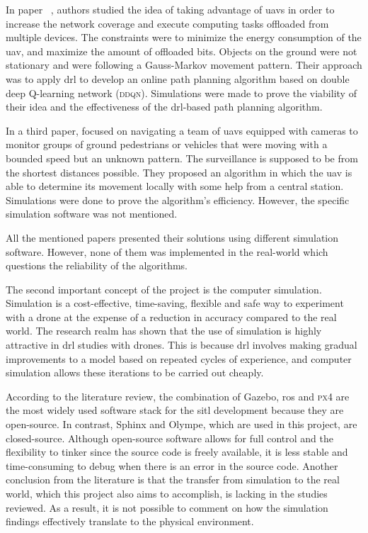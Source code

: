 \documentclass[../main.tex]{subfiles}
\begin{document}
		
		In paper ~\cite{pen21}, authors \citeauthor{pen21} studied the idea 
		of taking advantage of \glspl{uav} in order to increase the network
		 coverage and execute computing tasks offloaded from multiple devices. 
		The constraints were to minimize the energy consumption of the \gls{uav}, 
		and maximize the amount of offloaded bits. 
		Objects on the ground were not stationary and were following a Gauss-Markov 
		movement pattern. Their approach was to apply \gls{drl} to develop an online path planning algorithm based on double deep Q-learning network (\textsc{ddqn}).
		Simulations were made to prove the viability of their idea and the 
		effectiveness of the \gls{drl}-based path planning algorithm.
		
		In a third paper, \citeauthor{hua21} focused on navigating a team
		of \glspl{uav} equipped with cameras to monitor groups of ground 
		pedestrians or vehicles that were moving with a bounded speed but an unknown pattern. 
		The surveillance is supposed to be from the shortest distances possible. 
		They proposed an algorithm in which the \gls{uav} is able to determine 
		its movement locally with some help from a central station.
		Simulations were done to prove the algorithm's efficiency. However, the 
		specific simulation software was not mentioned. 
		
		All the mentioned papers presented their solutions using different 
		simulation software. However, none of them was implemented in the real-world which questions the reliability of the algorithms.




The second important concept of the project is the computer simulation.
Simulation is a cost-effective, time-saving, flexible 
and safe way to experiment with a drone
at the expense of a reduction in accuracy compared to the real world.
The research realm has shown that the use of simulation 
is highly attractive in \gls{drl} studies with drones.
This is because \gls{drl} involves
making gradual improvements to a model based on 
repeated cycles of experience, and computer simulation 
allows these iterations to be carried out cheaply.

According to the literature review, 
the combination of Gazebo, \gls{ros}
and \textsc{px4} are the most widely used software stack 
for the \gls{sitl} development
because they are open-source. 
In contrast, Sphinx and Olympe, which are used in this project, 
are closed-source.
Although open-source software 
allows for full control and the flexibility to tinker
since the source code is freely available,
it is less stable and time-consuming to debug
when there is an error in the source code.
Another conclusion from the literature is that 
the transfer from simulation to the real world,
which this project also aims to accomplish,
is lacking in the studies reviewed.
As a result, it is not possible to comment on 
how the simulation findings effectively translate
to the physical environment.
\end{document}
